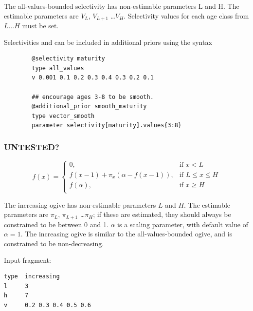 The all-values-bounded selectivity has non-estimable parameters L and H. The estimable parameters are $V_L$, $V_{L+1}$ \ldots $V_H$. Selectivity values for each age class from $L \ldots H$ must be set.

Selectivities  and  can be included in additional priors using the syntax

{\small{\begin{verbatim}
		@selectivity maturity
		type all_values
		v 0.001 0.1 0.2 0.3 0.4 0.3 0.2 0.1

		## encourage ages 3-8 to be smooth.
		@additional_prior smooth_maturity
		type vector_smooth
		parameter selectivity[maturity].values{3:8}

		\end{verbatim}}}

\subsubsection[Increasing ]{ UNTESTED?}

\begin{equation}
f(x)=\begin{cases}
	  0, & \text{if $x < L$} \\
	  f(x-1)+ \pi_x(\alpha-f(x-1)), & \text{if $L \le x \le H$} \\
	  f(\alpha), & \text{if $x \ge H$} \\
  \end{cases}
\end{equation}

The increasing ogive has non-estimable parameters $L$ and $H$. The estimable parameters are $\pi_L$, $\pi_{L+1}$ \ldots $\pi_H$; if these are estimated, they should always be constrained to be between 0 and 1. $\alpha$ is a scaling parameter, with default value of $\alpha = 1$. The increasing ogive is similar to the all-values-bounded ogive, and is constrained to be non-decreasing.

Input fragment: {\small{\begin{verbatim}
type  increasing
l     3
h     7
v     0.2 0.3 0.4 0.5 0.6

\end{verbatim}}}
\subsubsection[Logistic]{}

